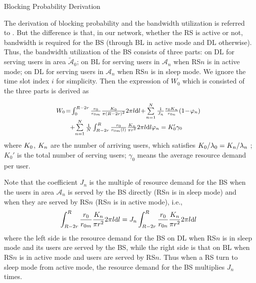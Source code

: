 \documentclass[conference]{IEEEtran}
\begin{document}
  \vspace{-0.1cm}
 \begin{appendix}
 \centerline{Blocking Probability Derivation}
 The derivation of blocking probability and the bandwidth utilization is referred to \cite{Jie2012Adynamic}. But the difference is that, in our network, whether the RS is active or not, bandwidth is required for the BS (through BL in active mode and DL otherwise). Thus, the bandwidth utilization of the BS consists of three parts: on DL for serving users in area $\widetilde{\mathcal{A}}_0$; on BL for serving users in $\mathcal{A}_n$ when RS$n$ is in active mode; on DL for serving users in $\mathcal{A}_n$ when RS$n$ is in sleep mode. We ignore the time slot index $i$ for simplicity. Then the expression of $W_0$ which is consisted of the three parts is derived as

 \begin{equation}\label{equ:W0}
 \small{\begin{array}{l}
  W_0\!=\!\int_0^{R - 2r} {\frac{{{r_0}}}{{{r_{0m}}}}} \frac{{{K_0}}}{{\pi {{(R - 2r)}^2}}}2\pi l{\rm{d}}l\!+\!\sum\limits_{n = 1}^N {\frac{1}{{{J_n}}}} \frac{{{r_0}{K_n}}}{{{r_{0n}}}}(1\!-\!{\varphi _n})\\~~~~~~~\!+\!\sum\limits_{n = 1}^N {\frac{1}{N}\int_{R - 2r}^R {\frac{{{r_0}}}{{{r_{0m}}(l)}}} } \frac{{{K_n}}}{{\pi {r^2}}}2\pi l{\rm{d}}l \varphi_n = K_0'\gamma_0
 \end{array}}
 \end{equation}
 where $\tiny{K_0}$, $\tiny{K_n}$ are the number of arriving users, which satisfies $\tiny{K_0/\lambda_0=K_n/\lambda_n}$ \cite{Jie2012Adynamic}; $K_0'$ is the total number of serving users; $\gamma_0$ means the average resource demand per user.

 Note that the coefficient $J_n$ is the multiple of resource demand for the BS when the users in area $\mathcal{A}_n$ is served by the BS directly (RS$n$ is in sleep mode) and when they are served by RS$n$ (RS$n$ is in active mode), i.e.,
 \begin{equation}\label{equ:Jn}
 \small{\int_{R-2r}^R\frac{r_0}{r_{0m}}\frac{K_n}{\pi r^2}2\pi l\text dl = J_n\int_{R-2r}^R\frac{r_0}{r_{0n}}\frac{K_n}{\pi r^2}2\pi l\text dl}
 \end{equation}
 where the left side is the resource demand for the BS on DL when RS$n$ is in sleep mode and its users are served by the BS, while the right side is that on BL when RS$n$ is in active mode and users are served by RS$n$. Thus when a RS turn to sleep mode from active mode, the resource demand for the BS multiplies $J_n$ times.


\end{appendix}
\end{document}
